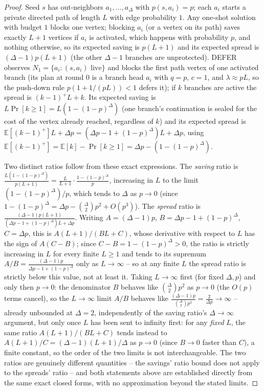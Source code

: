 \documentclass[preprint,11pt]{elsarticle}
\theoremstyle{definition}
\theoremstyle{remark}
\begin{document}
\begin{proof}
Seed $s$ has out-neighbors $a_1,\dots,a_\Delta$ with $p(s,a_i)=p$; each
$a_i$ starts a private directed path of length $L$ with edge probability
$1$. Any one-shot solution with budget $1$ blocks one vertex; blocking
$a_i$ (or a vertex on its path) saves exactly $L+1$ vertices if $a_i$ is
activated, which happens with probability $p$, and nothing otherwise, so
its expected saving is $p(L+1)$ and its expected spread is
$(\Delta-1)p(L+1)$ (the other $\Delta-1$ branches are unprotected). DEFER
observes $N_1=\{a_i:(s,a_i)\text{ live}\}$ and blocks the first path vertex
of one activated branch (its plan at round $0$ is a branch head $a_i$ with
$q=p$, $c=1$, and $\lambda\approx pL$, so the push-down rule
$p(1+1/(pL))<1$ defers it); if $k$ branches are active the spread is
$(k-1)^+L+k$. Its expected saving is $L\Pr[k\ge1]=L(1-(1-p)^\Delta)$ (one
branch's continuation is sealed for the cost of the vertex already reached,
regardless of $k$) and its expected spread is
$\mathbb E[(k-1)^+]L+\Delta p=(\Delta p-1+(1-p)^\Delta)L+\Delta p$, using
$\mathbb E[(k-1)^+]=\mathbb E[k]-\Pr[k\ge1]=\Delta p-(1-(1-p)^\Delta)$.

Two distinct ratios follow from these exact expressions. The \emph{saving}
ratio is $\frac{L(1-(1-p)^\Delta)}{p(L+1)}=\frac{L}{L+1}\cdot
\frac{1-(1-p)^\Delta}{p}$, increasing in $L$ to the limit
$(1-(1-p)^\Delta)/p$, which tends to $\Delta$ as $p\to0$ (since
$1-(1-p)^\Delta=\Delta p-\binom\Delta2p^2+O(p^3)$). The \emph{spread} ratio
is $\frac{(\Delta-1)p(L+1)}{(\Delta p-1+(1-p)^\Delta)L+\Delta p}$. Writing
$A=(\Delta-1)p$, $B=\Delta p-1+(1-p)^\Delta$, $C=\Delta p$, this is
$A(L+1)/(BL+C)$, whose derivative with respect to $L$ has the sign of
$A(C-B)$; since $C-B=1-(1-p)^\Delta>0$, the ratio is strictly increasing in
$L$ for every finite $L\ge1$ and tends to its supremum $A/B=\frac{(\Delta-1)p}
{\Delta p-1+(1-p)^\Delta}$ only as $L\to\infty$ -- so at any finite $L$ the
spread ratio is strictly below this value, not at least it. Taking
$L\to\infty$ first (for fixed $\Delta,p$) and only then $p\to0$: the
denominator $B$ behaves like $\binom\Delta2p^2$ as $p\to0$ (the $O(p)$
terms cancel), so the $L\to\infty$ limit $A/B$ behaves like
$\frac{(\Delta-1)p}{\binom\Delta2p^2}=\frac{2}{\Delta p}\to\infty$ --
already unbounded at $\Delta=2$, independently of the saving ratio's
$\Delta\to\infty$ argument, but only once $L$ has been sent to infinity
first: for any \emph{fixed} $L$, the same ratio $A(L+1)/(BL+C)$ tends
instead to $A(L+1)/C=(\Delta-1)(L+1)/\Delta$ as $p\to0$ (since $B\to0$
faster than $C$), a finite constant, so the order of the two limits is not
interchangeable. The two ratios are genuinely different quantities -- the
savings' ratio bound does not apply to the spreads' ratio -- and both
statements above are established directly from the same exact closed
forms, with no approximation beyond the stated limits.
\end{proof}
\end{document}
